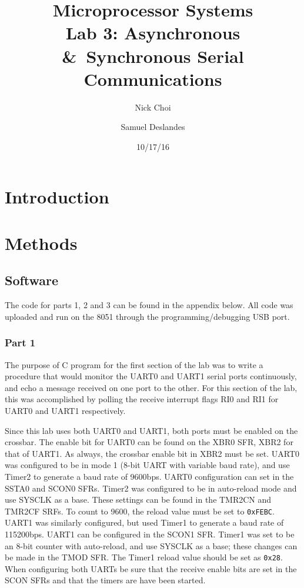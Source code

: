 \documentclass[12pt]{article}
\begin{document}
\title{Microprocessor Systems\\ Lab 3: Asynchronous \&\ Synchronous Serial Communications }
\author{Nick Choi \and Samuel Deslandes}
\date{10/17/16}
\maketitle
\pagebreak
\section{Introduction}


\section{Methods}
\subsection{Software}
The code for parts 1, 2 and 3 can be found in the appendix below. All code was uploaded and run on the 8051 through the programming/debugging USB port. 	

\subsubsection{Part 1}
The purpose of C program for the first section of the lab was to write a procedure that would monitor the UART0 and UART1 serial ports continuously, and echo a message received on one port to the other. For this section of the lab, this was accomplished by polling the receive interrupt flags RI0 and RI1 for UART0 and UART1 respectively. 

Since this lab uses both UART0 and UART1, both ports must be enabled on the crossbar. The enable bit for UART0 can be found on the XBR0 SFR, XBR2 for that of UART1. As always, the crossbar enable bit in XBR2 must be set. UART0 was configured to be in mode 1 (8-bit UART with variable baud rate), and use Timer2 to generate a baud rate of \si{9600}{bps}. UART0 configuration can set in the SSTA0 and SCON0 SFRs. Timer2 was configured to be in auto-reload mode and use SYSCLK as a base. These settings can be found in the TMR2CN and TMR2CF SRFs. To count to 9600, the reload value must be set to \texttt{0xFEBC}.
UART1 was similarly configured, but used Timer1 to generate a baud rate of \si{115200}{bps}. UART1 can be configured in the SCON1 SFR. Timer1 was set to be an 8-bit counter with auto-reload, and use SYSCLK as a base; these changes can be made in the TMOD SFR. The Timer1 reload value should be set as \texttt{0x28}. When configuring both UARTs be sure that the receive enable bits are set in the SCON SFRs and that the timers are have been started. 
\end{document}
